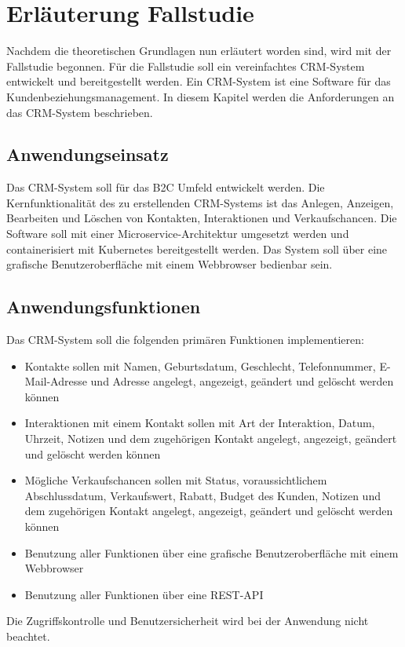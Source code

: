 \section{Erläuterung Fallstudie}
Nachdem die theoretischen Grundlagen nun erläutert worden sind, wird mit der Fallstudie begonnen. Für die Fallstudie soll ein vereinfachtes \ac{CRM-System} entwickelt und bereitgestellt werden. Ein \ac{CRM-System} ist eine Software für das Kundenbeziehungsmanagement. In diesem Kapitel werden die Anforderungen an das \ac{CRM-System} beschrieben.

\subsection{Anwendungseinsatz}
Das CRM-System soll für das \ac{B2C} Umfeld entwickelt werden. Die Kernfunktionalität des zu erstellenden CRM-Systems ist das Anlegen, Anzeigen, Bearbeiten und Löschen von Kontakten, Interaktionen und Verkaufschancen. Die Software soll mit einer Microservice-Architektur umgesetzt werden und containerisiert mit Kubernetes bereitgestellt werden. Das System soll über eine grafische Benutzeroberfläche mit einem Webbrowser bedienbar sein.

\subsection{Anwendungsfunktionen}
Das CRM-System soll die folgenden primären Funktionen implementieren:
\begin{itemize}
\item Kontakte sollen mit Namen, Geburtsdatum, Geschlecht, Telefonnummer, E-Mail-Adresse und Adresse angelegt, angezeigt, geändert und gelöscht werden können
\item Interaktionen mit einem Kontakt sollen mit Art der Interaktion, Datum, Uhrzeit, Notizen und dem zugehörigen Kontakt angelegt, angezeigt, geändert und gelöscht werden können
\item Mögliche Verkaufschancen sollen mit Status, voraussichtlichem Abschlussdatum, Verkaufswert, Rabatt, Budget des Kunden, Notizen und dem zugehörigen Kontakt angelegt, angezeigt, geändert und gelöscht werden können
\item Benutzung aller Funktionen über eine grafische Benutzeroberfläche mit einem Webbrowser
\item Benutzung aller Funktionen über eine REST-API
\end{itemize} 

Die Zugriffskontrolle und Benutzersicherheit wird bei der Anwendung nicht beachtet.

